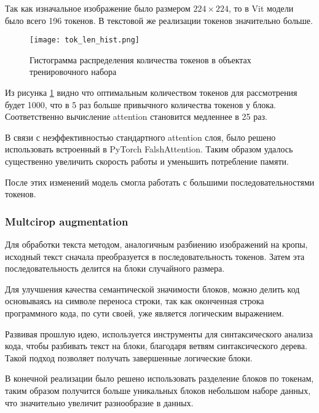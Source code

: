 \documentclass[../part_2.tex]{subfiles}
\begin{document}
    \par Так как изначальное изображение было размером $224\times224$, то в Vit модели было всего 196 токенов. В текстовой же реализации токенов значительно больше.
    \begin{figure}[H]
        \centering
        \texttt{[image: tok\_len\_hist.png]}
        \caption{Гистограмма распределения количества токенов в объектах тренировочного набора}
        \label{fig:tok_len_hist}
    \end{figure}
    \par Из рисунка \ref{fig:tok_len_hist} видно что оптимальным количеством токенов для рассмотрения будет 1000, что в 5 раз больше привычного количества токенов у блока. Соответственно вычисление attention становится медленнее в 25 раз.
    \par В связи с неэффективностью стандартного attention слоя, было решено использовать встроенный в PyTorch FalshAttention\cite{dao2022flashattentionfastmemoryefficientexact}. Таким образом удалось существенно увеличить скорость работы и уменьшить потребление памяти.
    \par После этих изменений модель смогла работать с большими последовательностями токенов.

    \subsubsection{Multcirop augmentation}
    \par Для обработки текста методом, аналогичным разбиению изображений на кропы, исходный текст сначала преобразуется в последовательность токенов. Затем эта последовательность делится на блоки случайного размера.
    \par Для улучшения качества семантической значимости блоков, можно делить код основываясь на символе переноса строки, так как оконченная строка программного кода, по сути своей, уже является логическим выражением.
    \par Развивая прошлую идею, используется инструменты для синтаксического анализа кода, чтобы разбивать текст на блоки, благодаря ветвям синтаксического дерева. Такой подход позволяет получать завершенные логические блоки.
    \par В конечной реализации было решено использовать разделение блоков по токенам, таким образом получится больше уникальных блоков небольшом наборе данных, что значительно увеличит разнообразие в данных.
\end{document}
